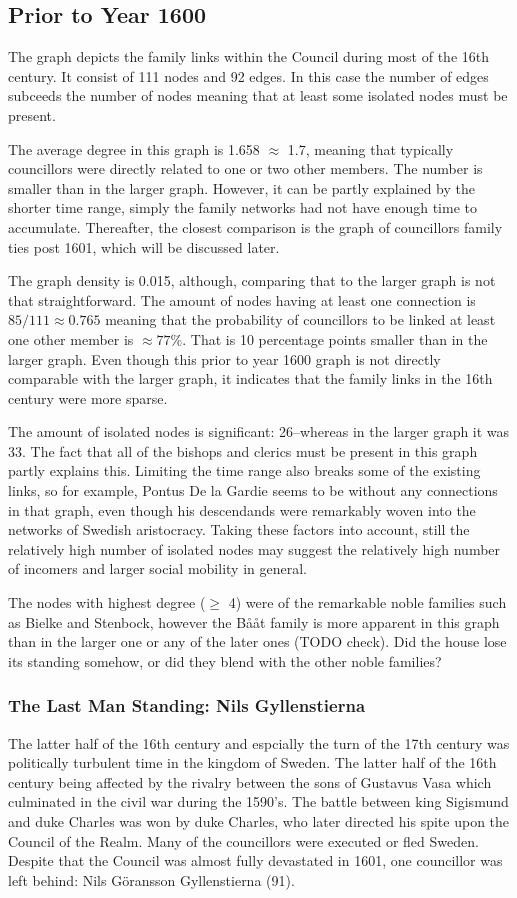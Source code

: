 \subsection{Prior to Year 1600}
The graph depicts the family links within the Council during most of the 16th century. It consist of 111 nodes and 92 edges. In this case the number of edges subceeds the number of nodes meaning that at least some isolated nodes must be present. 

The average degree in this graph is 1.658 $\approx$ 1.7, meaning that typically councillors were directly related to one or two other members. The number is smaller than in the larger graph. However, it can be partly explained by the shorter time range, simply the family networks had not have enough time to accumulate. Thereafter, the closest comparison is the graph of councillors family ties post 1601, which will be discussed later.

The graph density is 0.015, although, comparing that to the larger graph is not that straightforward. The amount of nodes having at least one connection is $85/111 \approx 0.765$ meaning that the probability of councillors to be linked at least one other member is $\approx 77\%$. That is 10 percentage points smaller than in the larger graph. Even though this prior to year 1600 graph is not directly comparable with the larger graph, it indicates that the family links in the 16th century were more sparse.

The amount of isolated nodes is significant: 26–whereas in the larger graph it was 33. The fact that all of the bishops and clerics must be present in this graph partly explains this. Limiting the time range also breaks some of the existing links, so for example, Pontus De la Gardie seems to be without any connections in that graph, even though his descendands were remarkably woven into the networks of Swedish aristocracy. Taking these factors into account, still the relatively high number of isolated nodes may suggest the relatively high number of incomers and larger social mobility in general.

The nodes with highest degree ($\geq$ 4) were of the remarkable noble families such as Bielke and Stenbock, however the Bååt family is more apparent in this graph than in the larger one or any of the later ones (TODO check). Did the house lose its standing somehow, or did they blend with the other noble families?

\subsubsection{The Last Man Standing: Nils Gyllenstierna}
The latter half of the 16th century and espcially the turn of the 17th century was politically turbulent time in the kingdom of Sweden. The latter half of the 16th century being affected by the rivalry between the sons of Gustavus Vasa which culminated in the civil war during the 1590's. The battle between king Sigismund and duke Charles was won by duke Charles, who later directed his spite upon the Council of the Realm. Many of the councillors were executed or fled Sweden. Despite that the Council was almost fully devastated in 1601, one councillor was left behind: Nils Göransson Gyllenstierna (91).

